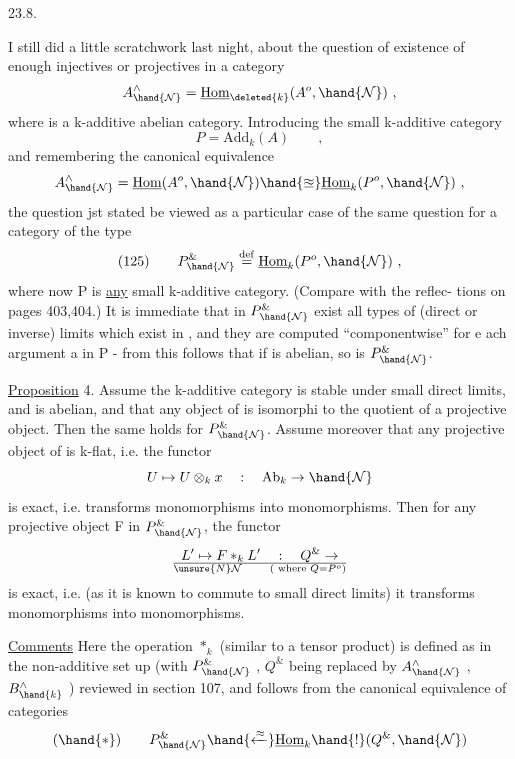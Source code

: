 
23.8.

 I still did a little scratchwork last night,  about the question
of existence of enough injectives or projectives in a category
\[ A^{\wedge}_{\hand{\mathcal{N}}} = \underline{\mathrm{Hom}}_{\deleted{k}}(A^{o},\hand{\mathcal{N}}) \ , \]
where  is a k-additive abelian category.  Introducing  the small
k-additive category
\[ P = \mathrm{Add}_{k}(A) \qquad , \]
and remembering the canonical equivalence 
\[ A^{\wedge}_{\hand{\mathcal{N}}} = \underline{\mathrm{Hom}}(A^{o},\hand{\mathcal{N}}) \hand{\approxeq} \underline{\mathrm{Hom}}_{k}(P^{o},\hand{\mathcal{N}}) \ , \]
the question jst stated  be viewed as a particular case 
of the same question for a category of the type
\[ (125) \qquad P^{\&}_{\hand{\mathcal{N}}} \overset{\mathrm{def}}{=} \underline{\mathrm{Hom}}_{k}(P^{o},\hand{\mathcal{N}}) \ , \]
where now P is \uline{any} small k-additive category. (Compare with the reflec-%
tions on pages 403,404.)  It is immediate that in $P^{\&}_{\hand{\mathcal{N}}}$ exist all types
of (direct or inverse) limits which exist in ,  and they are computed
``componentwise'' for e ach argument a in P  -  from this follows that if
 is abelian,  so is $P^{\&}_{\hand{\mathcal{N}}}$.

\uline{Proposition} 4.   Assume the k-additive category  is stable under small
direct limits,  and is abelian,  and that any object of  is isomorphi
to the quotient of a projective object.  Then the same holds for $P^{\&}_{\hand{\mathcal{N}}}$.
Assume moreover that any projective object  of  is k-flat,  i.e. the
functor
\[ U \mapsto U\otimes_{k} x \quad : \quad \mathrm{Ab}_{k} \to \hand{\mathcal{N}} \]
is exact,  i.e. transforms monomorphisms into monomorphisms.  Then for
any projective object F in $P^{\&}_{\hand{\mathcal{N}}}$,  the functor
\[ L' \mapsto F *_{k} L' \quad : \quad Q^{\&} \to \over{\unsure{N}}{\mathcal{N}} \qquad (\text{ where } Q = P^{o}) \]
is exact,  i.e. (as it is known to commute to small direct limits) it
transforms monomorphisms into monomorphisms.

\uline{Comments}  Here the operation $*_{k}$  (similar to a tensor product)  is
defined as in the non-additive set up  (with $P^{\&}_{\hand{\mathcal{N}}}$ , $Q^{\&}$  being replaced
by $A^{\wedge}_{\hand{\mathcal{N}}}$ , $B^{\wedge}_{\hand{k}}$ ) reviewed in section 107,  and follows from the canonical
equivalence of categories
\[ (\hand{*}) \qquad P^{\&}_{\hand{\mathcal{N}}} \hand{\xleftarrow{\approx}} \underline{\mathrm{Hom}}_{k}\hand{!}(Q^{\&} ,\hand{\mathcal{N}}) \]

